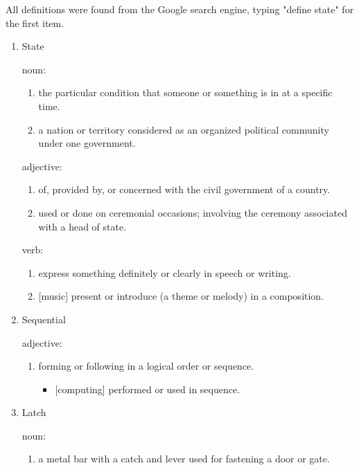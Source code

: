 \documentclass[12pt]{article}
\begin{document}
All definitions were found from the Google search engine, typing "define state" for the first item.

\begin{enumerate}
  \item State

  noun:

  \begin{enumerate}
    \item the particular condition that someone or something is in at a specific time.
    \item a nation or territory considered as an organized political community under one government.
  \end{enumerate}

  adjective:

  \begin{enumerate}
    \item of, provided by, or concerned with the civil government of a country.
    \item used or done on ceremonial occasions; involving the ceremony associated with a head of state.
  \end{enumerate}

  verb:

  \begin{enumerate}
    \item express something definitely or clearly in speech or writing.
    \item {[music]} present or introduce (a theme or melody) in a composition.
  \end{enumerate}

  \item Sequential

  adjective:

  \begin{enumerate}
    \item forming or following in a logical order or sequence.

    \begin{itemize}
      \item {[computing]} performed or used in sequence.
    \end{itemize}
  \end{enumerate}

  \item{Latch}

  noun:

  \begin{enumerate}
    \item a metal bar with a catch and lever used for fastening a door or gate.
  \end{enumerate}


\end{enumerate}
\end{document}
